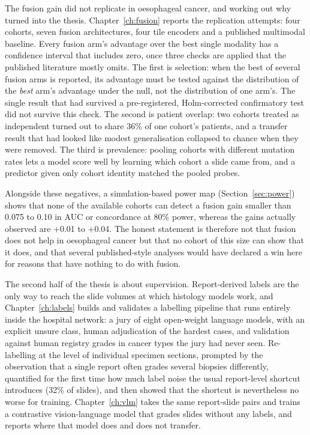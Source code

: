 The fusion gain did not replicate in oesophageal cancer, and working out why turned into the thesis. Chapter~\ref{ch:fusion} reports the replication attempts: four cohorts, seven fusion architectures, four tile encoders and a published multimodal baseline. Every fusion arm's advantage over the best single modality has a confidence interval that includes zero, once three checks are applied that the published literature mostly omits. The first is selection: when the best of several fusion arms is reported, its advantage must be tested against the distribution of the \emph{best} arm's advantage under the null, not the distribution of one arm's. The single result that had survived a pre-registered, Holm-corrected confirmatory test did not survive this check. The second is patient overlap: two cohorts treated as independent turned out to share 36\% of one cohort's patients, and a transfer result that had looked like modest generalisation collapsed to chance when they were removed. The third is prevalence: pooling cohorts with different mutation rates lets a model score well by learning which cohort a slide came from, and a predictor given only cohort identity matched the pooled probes.

Alongside these negatives, a simulation-based power map (Section~\ref{sec:power}) shows that none of the available cohorts can detect a fusion gain smaller than 0.075 to 0.10 in AUC or concordance at 80\% power, whereas the gains actually observed are +0.01 to +0.04. The honest statement is therefore not that fusion does not help in oesophageal cancer but that no cohort of this size can show that it does, and that several published-style analyses would have declared a win here for reasons that have nothing to do with fusion.

The second half of the thesis is about supervision. Report-derived labels are the only way to reach the slide volumes at which histology models work, and Chapter~\ref{ch:labels} builds and validates a labelling pipeline that runs entirely inside the hospital network: a jury of eight open-weight language models, with an explicit unsure class, human adjudication of the hardest cases, and validation against human registry grades in cancer types the jury had never seen. Re-labelling at the level of individual specimen sections, prompted by the observation that a single report often grades several biopsies differently, quantified for the first time how much label noise the usual report-level shortcut introduces (32\% of slides), and then showed that the shortcut is nevertheless no worse for training. Chapter~\ref{ch:vlm} takes the same report-slide pairs and trains a contrastive vision-language model that grades slides without any labels, and reports where that model does and does not transfer.

